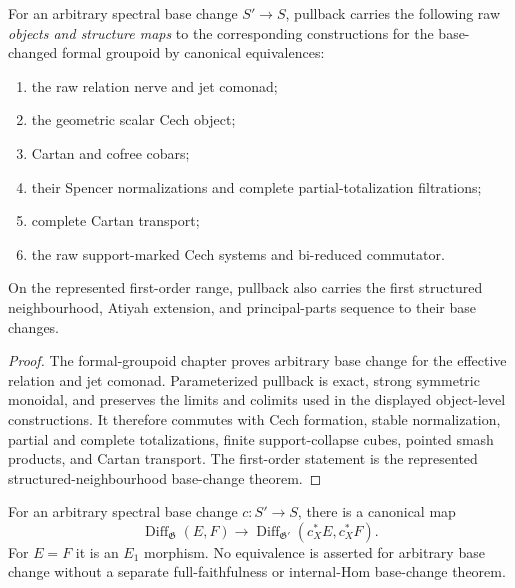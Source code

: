 \begin{theorem}
\label{thm:as-arbitrary-base-change}
For an arbitrary spectral base change $S'\to S$, pullback carries the
following raw \emph{objects and structure maps} to the corresponding
constructions for the base-changed formal groupoid by canonical equivalences:
\begin{enumerate}
    \item the raw relation nerve and jet comonad;
    \item the geometric scalar Cech object;
    \item Cartan and cofree cobars;
    \item their Spencer normalizations and complete partial-totalization
    filtrations;
    \item complete Cartan transport;
    \item the raw support-marked Cech systems and bi-reduced commutator.
\end{enumerate}
On the represented first-order range, pullback also carries the first
structured neighbourhood, Atiyah extension, and principal-parts sequence to
their base changes.
\end{theorem}

\begin{proof}
The formal-groupoid chapter proves arbitrary base change for the effective
relation and jet comonad.  Parameterized pullback is exact, strong symmetric
monoidal, and preserves the limits and colimits used in the displayed
object-level constructions.  It therefore commutes with Cech formation,
stable normalization, partial and complete totalizations, finite
support-collapse cubes, pointed smash products, and Cartan transport.  The
first-order statement is the represented structured-neighbourhood
base-change theorem.
\end{proof}

\begin{proposition}
\label{prop:as-cokleisli-base-change-map}
For an arbitrary spectral base change $c:S'\to S$, there is a canonical map
\[
\boxed{
    \operatorname{Diff}_{\mathfrak G}(E,F)
    \longrightarrow
    \operatorname{Diff}_{\mathfrak G'}
    (c_X^*E,c_X^*F).
}
\]
For $E=F$ it is an $E_1$ morphism.  No equivalence is asserted for arbitrary
base change without a separate full-faithfulness or internal-Hom
base-change theorem.
\end{proposition}

